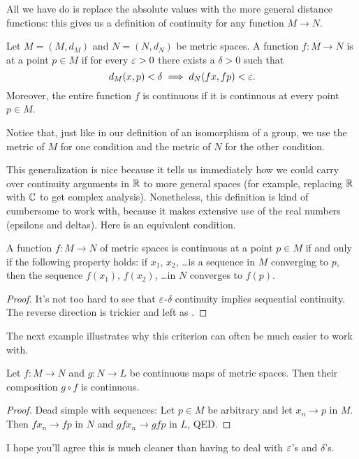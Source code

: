 All we have do is replace the absolute values with the more general distance functions: this gives us a definition of continuity for any function $M \to N$.

\begin{definition}
	Let $M = (M, d_M)$ and $N = (N, d_N)$ be metric spaces.
	A function $f : M \to N$ is  at a point $p \in M$
	if for every $\varepsilon > 0$ there exists a $\delta > 0$ such that
	\[ d_M(x,p) < \delta \implies d_N(fx, fp) < \varepsilon. \]
	Moreover, the entire function $f$ is continuous if it is continuous at every point $p \in M$.
\end{definition}
Notice that, just like in our definition of an isomorphism of a group,
we use the metric of $M$ for one condition
and the metric of $N$ for the other condition.

This generalization is nice because it tells us immediately how we could carry over continuity arguments in $\mathbb R$ to more general spaces (for example, replacing $\mathbb R$ with $\mathbb C$ to get complex analysis).
Nonetheless, this definition is kind of cumbersome to work with, because it makes extensive use of the real numbers (epsilons and deltas).
Here is an equivalent condition.
\begin{theorem}
	\label{thm:seq_cont}
	A function $f : M \to N$ of metric spaces is continuous at a point $p \in M$
	if and only if the following property holds:
	if $x_1$, $x_2$, \dots is a sequence in $M$ converging to $p$,
	then the sequence $f(x_1)$, $f(x_2)$, \dots in $N$ converges to $f(p)$.
\end{theorem}
\begin{proof}
	It's not too hard to see that $\varepsilon$-$\delta$ continuity implies sequential continuity.
	The reverse direction is trickier and left as .
\end{proof}

The next example illustrates why this criterion can often be much easier to work with.
\begin{proposition}
	Let $f : M \to N$ and $g : N \to L$ be continuous maps of metric spaces.
	Then their composition $g \circ f$ is continuous.
\end{proposition}
\begin{proof}
	Dead simple with sequences:
	Let $p \in M$ be arbitrary and let $x_n \to p$ in $M$.
	Then $fx_n \to fp$ in $N$ and $gfx_n \to gfp$ in $L$, QED.
\end{proof}
I hope you'll agree this is much cleaner than having to deal with $\varepsilon$'s and $\delta$'s.


